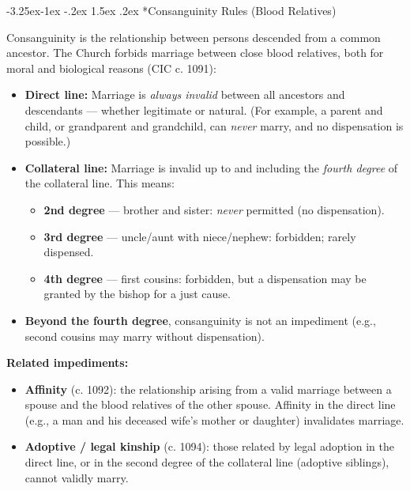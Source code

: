 \documentclass[11pt]{article}
\makeatletter
\renewcommand\subsection{\@startsection{subsection}{2}{\z@}%
  {-3.25ex\@plus -1ex \@minus -.2ex}%
  {1.5ex \@plus .2ex}%
  {\normalfont\large\bfseries\color{churchgold}}}
\makeatother
\begin{document}
\subsection*{Consanguinity Rules (Blood Relatives)}

Consanguinity is the relationship between persons descended from a common
ancestor. The Church forbids marriage between close blood relatives, both
for moral and biological reasons (CIC c. 1091):

\begin{itemize}
  \item \textbf{Direct line:} Marriage is \emph{always invalid} between all
        ancestors and descendants --- whether legitimate or natural. (For
        example, a parent and child, or grandparent and grandchild, can
        \emph{never} marry, and no dispensation is possible.)
  \item \textbf{Collateral line:} Marriage is invalid up to and including
        the \emph{fourth degree} of the collateral line. This means:
        \begin{itemize}
          \item \textbf{2nd degree} --- brother and sister: \emph{never} permitted (no dispensation).
          \item \textbf{3rd degree} --- uncle/aunt with niece/nephew: forbidden; rarely dispensed.
          \item \textbf{4th degree} --- first cousins: forbidden, but a dispensation may be granted by the bishop for a just cause.
        \end{itemize}
  \item \textbf{Beyond the fourth degree}, consanguinity is not an impediment (e.g., second cousins may marry without dispensation).
\end{itemize}

\textbf{Related impediments:}
\begin{itemize}
  \item \textbf{Affinity} (c. 1092): the relationship arising from a valid
        marriage between a spouse and the blood relatives of the other
        spouse. Affinity in the direct line (e.g., a man and his deceased
        wife's mother or daughter) invalidates marriage.
  \item \textbf{Adoptive / legal kinship} (c. 1094): those related by legal
        adoption in the direct line, or in the second degree of the
        collateral line (adoptive siblings), cannot validly marry.
\end{itemize}
\end{document}

